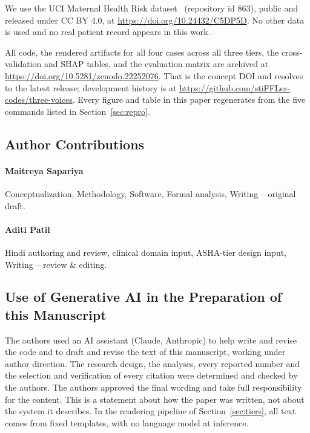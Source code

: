 We use the UCI Maternal Health Risk dataset~\citep{ahmed2020maternal}
(repository id 863),
public and released under CC BY 4.0, at
\url{https://doi.org/10.24432/C5DP5D}. No other data is used and no real
patient record appears in this work.

All code, the rendered artifacts for all four cases across all three tiers,
the cross-validation and SHAP tables, and the evaluation matrix are archived
at \url{https://doi.org/10.5281/zenodo.22252076}. That is the concept DOI
and resolves to the latest release; development history is at
\url{https://github.com/stiFFLer-codes/three-voices}. Every figure and table
in this paper regenerates from the five commands listed in
Section~\ref{sec:repro}.

\subsection*{Author Contributions}

\paragraph{Maitreya Sapariya} Conceptualization, Methodology, Software,
Formal analysis, Writing -- original draft.

\paragraph{Aditi Patil} Hindi authoring and review, clinical domain input,
ASHA-tier design input, Writing -- review \& editing.

\subsection*{Use of Generative AI in the Preparation of this Manuscript}

The authors used an AI assistant (Claude, Anthropic) to help write and revise
the code and to draft and revise the text of this manuscript, working under
author direction. The research design, the analyses, every reported number and
the selection and verification of every citation were determined and checked
by the authors. The authors approved the final wording and take full
responsibility for the content. This is a statement about how the paper was
written, not about the system it describes. In the rendering pipeline of
Section~\ref{sec:tiers}, all text comes from fixed templates, with no
language model at inference.
